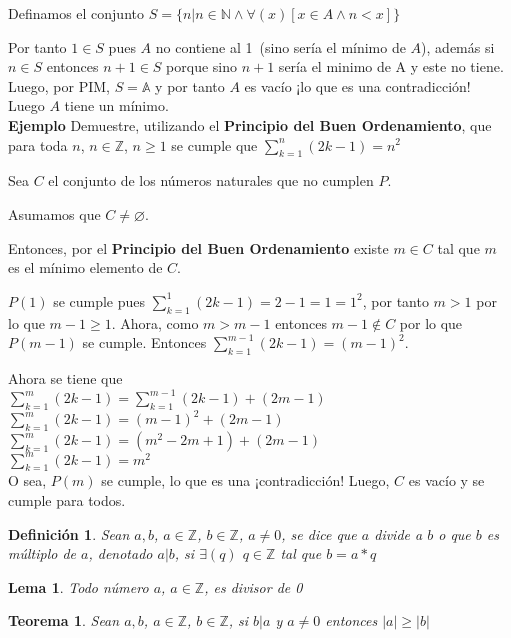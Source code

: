 \documentclass[a4paper,1pt]{report}
\newtheorem*{teo}{Teorema}
\newtheorem*{dfn}{Definición}
\newtheorem*{lem}{Lema}
\begin{document}
Definamos el conjunto $S=\{n|n\in\mathbb{N}\wedge\forall(x)[x\in A\wedge n<x]\}$

Por tanto $1\in S$ pues $A$ no contiene al 1~(sino sería el mínimo de $A$), además si $n\in S$
entonces $n+1\in S$ porque sino $n+1$ sería el minimo de A y este no tiene. Luego, por PIM, $S=\mathbb{A}$ y por tanto $A$ es vacío ¡lo que es una contradicción! Luego $A$ tiene un mínimo.\\

\textbf{Ejemplo}
Demuestre, utilizando el \textbf{Principio del Buen Ordenamiento}, que para toda $n$, $n\in\mathbb{Z}$, $n\geq 1$ se cumple que $\sum^n_{k=1}(2k-1)=n^2$

Sea $C$ el conjunto de los números naturales que no cumplen $P$. 

Asumamos que $C\neq \varnothing$.

Entonces, por el \textbf{Principio del Buen Ordenamiento} existe $m\in C$ tal que $m$ es el mínimo elemento de $C$.

$P(1)$ se cumple pues $\sum^1_{k=1}(2k-1)=2-1=1=1^2$, por tanto $m>1$ por lo que $m-1\geq1$. Ahora, como $m > m-1$ entonces $m-1\notin C$ por lo que $P(m-1)$ se cumple. Entonces $\sum^{m-1}_{k=1}(2k-1)=(m-1)^2$.

Ahora se tiene que\\ 
$\sum^m_{k=1}(2k-1)=\sum^{m-1}_{k=1}(2k-1)+(2m-1)$\\
$\sum^m_{k=1}(2k-1)=(m-1)^2+(2m-1)$\\
$\sum^m_{k=1}(2k-1)=(m^2-2m+1)+(2m-1)$\\
$\sum^m_{k=1}(2k-1)=m^2$\\
O sea, $P(m)$ se cumple, lo que es una ¡contradicción! Luego, $C$ es vacío y se cumple para todos.

\begin{dfn}
 Sean $a,b$, $a\in\mathbb{Z}$, $b\in\mathbb{Z}$, $a\neq 0$, se dice que $a$ divide a $b$ o que $b$ es múltiplo de $a$, denotado $a|b$, si $\exists(q)$ $q\in\mathbb{Z}$ tal que $b=a*q$
\end{dfn}

\begin{lem}
 Todo número $a$, $a\in\mathbb{Z}$, es divisor de 0
\end{lem}

\begin{teo}
 Sean $a,b$, $a\in\mathbb{Z}$, $b\in\mathbb{Z}$, si $b|a$ y $a\neq 0$ entonces $|a| \geq |b|$
\end{teo}
\end{document}
